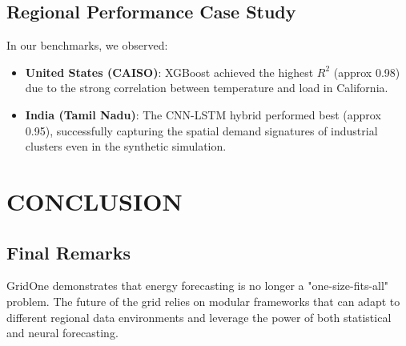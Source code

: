 \documentclass[12pt,a4paper,twoside,fleqn]{report}
\begin{document}
\section{Regional Performance Case Study}
In our benchmarks, we observed:
\begin{itemize}
    \item \textbf{United States (CAISO)}: XGBoost achieved the highest $R^2$ (approx 0.98) due to the strong correlation between temperature and load in California.
    \item \textbf{India (Tamil Nadu)}: The CNN-LSTM hybrid performed best (approx 0.95), successfully capturing the spatial demand signatures of industrial clusters even in the synthetic simulation.
\end{itemize}

\chapter{CONCLUSION}
\section{Final Remarks}
GridOne demonstrates that energy forecasting is no longer a "one-size-fits-all" problem. The future of the grid relies on modular frameworks that can adapt to different regional data environments and leverage the power of both statistical and neural forecasting.
\end{document}
